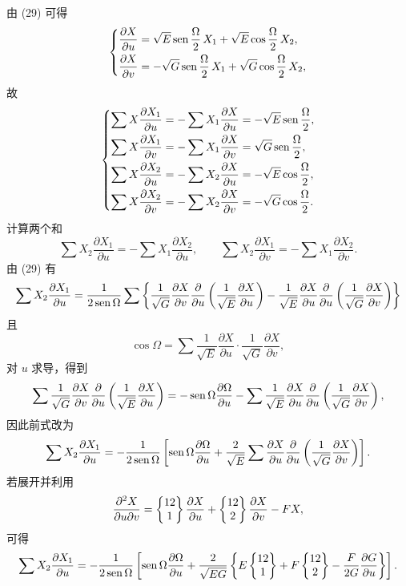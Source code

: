 由 (29) 可得
\[
\left\{\begin{aligned}
\frac{\partial X}{\partial u}&=\sqrt E\operatorname{sen}\frac\Omega2\,X_1+\sqrt E\cos\frac\Omega2\,X_2,\\
\frac{\partial X}{\partial v}&=-\sqrt G\operatorname{sen}\frac\Omega2\,X_1+\sqrt G\cos\frac\Omega2\,X_2,
\end{aligned}
\right.
\]
故
\[
\left\{\begin{aligned}
\sum X\frac{\partial X_1}{\partial u}&=-\sum X_1\frac{\partial X}{\partial u}=-\sqrt E\operatorname{sen}\frac\Omega2,\\
\sum X\frac{\partial X_1}{\partial v}&=-\sum X_1\frac{\partial X}{\partial v}=\sqrt G\operatorname{sen}\frac\Omega2,\\
\sum X\frac{\partial X_2}{\partial u}&=-\sum X_2\frac{\partial X}{\partial u}=-\sqrt E\cos\frac\Omega2,\\
\sum X\frac{\partial X_2}{\partial v}&=-\sum X_2\frac{\partial X}{\partial v}=-\sqrt G\cos\frac\Omega2.
\end{aligned}
\right.
\]
计算两个和
\[
 \sum X_2\frac{\partial X_1}{\partial u}=-\sum X_1\frac{\partial X_2}{\partial u},
\qquad
 \sum X_2\frac{\partial X_1}{\partial v}=-\sum X_1\frac{\partial X_2}{\partial v}.
\]
由 (29) 有
\[
\sum X_2\frac{\partial X_1}{\partial u}=
\frac1{2\operatorname{sen}\Omega}\sum\left\{
\frac1{\sqrt G}\frac{\partial X}{\partial v}\frac{\partial}{\partial u}\left(\frac1{\sqrt E}\frac{\partial X}{\partial u}\right)-
\frac1{\sqrt E}\frac{\partial X}{\partial u}\frac{\partial}{\partial u}\left(\frac1{\sqrt G}\frac{\partial X}{\partial v}\right)\right\}
\]
且
\[
 \cos\Omega=\sum \frac1{\sqrt E}\frac{\partial X}{\partial u}\cdot\frac1{\sqrt G}\frac{\partial X}{\partial v},
\]
对 \(u\) 求导，得到
\[
\sum\frac1{\sqrt G}\frac{\partial X}{\partial v}\frac{\partial}{\partial u}\left(\frac1{\sqrt E}\frac{\partial X}{\partial u}\right)
=-\operatorname{sen}\Omega\frac{\partial\Omega}{\partial u}
-\sum\frac1{\sqrt E}\frac{\partial X}{\partial u}\frac{\partial}{\partial u}\left(\frac1{\sqrt G}\frac{\partial X}{\partial v}\right),
\]
因此前式改为
\[
 \sum X_2\frac{\partial X_1}{\partial u}=-\frac1{2\operatorname{sen}\Omega}\left[
\operatorname{sen}\Omega\frac{\partial\Omega}{\partial u}+\frac2{\sqrt E}\sum\frac{\partial X}{\partial u}\frac{\partial}{\partial u}\left(\frac1{\sqrt G}\frac{\partial X}{\partial v}\right)\right].
\]
若展开并利用
\[
 \frac{\partial^2X}{\partial u\partial v}=
 \left\{\begin{matrix}12\\1\end{matrix}\right\}\frac{\partial X}{\partial u}+
 \left\{\begin{matrix}12\\2\end{matrix}\right\}\frac{\partial X}{\partial v}-FX,
\]
可得
\[
\sum X_2\frac{\partial X_1}{\partial u}=-\frac1{2\operatorname{sen}\Omega}\left[
\operatorname{sen}\Omega\frac{\partial\Omega}{\partial u}+\frac2{\sqrt{EG}}\left\{E\left\{\begin{matrix}12\\1\end{matrix}\right\}+F\left\{\begin{matrix}12\\2\end{matrix}\right\}-\frac F{2G}\frac{\partial G}{\partial u}\right\}\right].
\]
